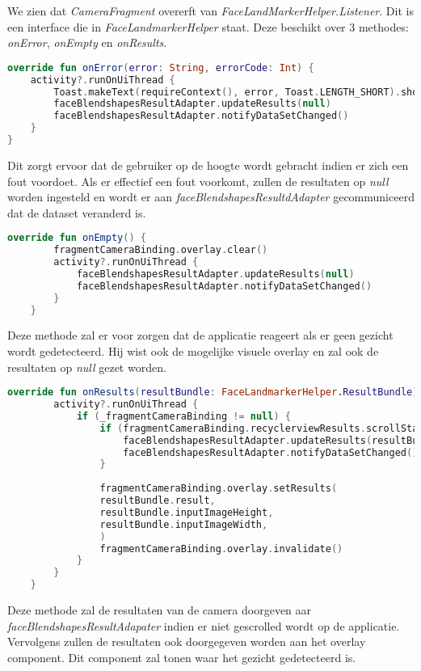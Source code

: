 We zien dat \emph{CameraFragment} overerft van \emph{FaceLandMarkerHelper.Listener}. Dit is een interface die in \emph{FaceLandmarkerHelper} staat. Deze beschikt over 3 methodes: \emph{onError}, \emph{onEmpty} en \emph{onResults}.
\begin{lstlisting}[language=Kotlin, caption=onError in CameraFragment.kt]
override fun onError(error: String, errorCode: Int) {
    activity?.runOnUiThread {
        Toast.makeText(requireContext(), error, Toast.LENGTH_SHORT).show()
        faceBlendshapesResultAdapter.updateResults(null)
        faceBlendshapesResultAdapter.notifyDataSetChanged()
    }
}
\end{lstlisting}
Dit zorgt ervoor dat de gebruiker op de hoogte wordt gebracht indien er zich een fout voordoet. Als er effectief een fout voorkomt, zullen de resultaten op \emph{null} worden ingesteld en wordt er aan \emph{faceBlendshapesResultdAdapter} gecommuniceerd dat de dataset veranderd is.

\begin{lstlisting}[language=Kotlin, caption=onEmpty in CameraFragment.kt]
    override fun onEmpty() {
        fragmentCameraBinding.overlay.clear()
        activity?.runOnUiThread {
            faceBlendshapesResultAdapter.updateResults(null)
            faceBlendshapesResultAdapter.notifyDataSetChanged()
        }
    }
\end{lstlisting}
Deze methode zal er voor zorgen dat de applicatie reageert als er geen gezicht wordt gedetecteerd. Hij wist ook de mogelijke visuele overlay en zal ook de resultaten op \emph{null} gezet worden.

\begin{lstlisting}[language=Kotlin, caption=onResults in CameraFragment.kt]
    override fun onResults(resultBundle: FaceLandmarkerHelper.ResultBundle) {
        activity?.runOnUiThread {
            if (_fragmentCameraBinding != null) {
                if (fragmentCameraBinding.recyclerviewResults.scrollState != SCROLL_STATE_DRAGGING) {
                    faceBlendshapesResultAdapter.updateResults(resultBundle.result)
                    faceBlendshapesResultAdapter.notifyDataSetChanged()
                }
                
                fragmentCameraBinding.overlay.setResults(
                resultBundle.result,
                resultBundle.inputImageHeight,
                resultBundle.inputImageWidth,
                )
                fragmentCameraBinding.overlay.invalidate()
            }
        }
    }
\end{lstlisting}
Deze methode zal de resultaten van de camera doorgeven aar \emph{faceBlendshapesResultAdapater} indien er niet gescrolled wordt op de applicatie. Vervolgens zullen de resultaten ook doorgegeven worden aan het overlay component. Dit component zal tonen waar het gezicht gedetecteerd is.

